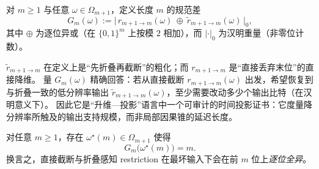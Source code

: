 \begin{definition}\label{def:fold-gauge-anomaly}
对 \(m\ge 1\) 与任意 \(\omega\in\Omega_{m+1}\)，定义长度 \(m\) 的规范差
$$
G_m(\omega)
:=\bigl|\,r_{m+1\to m}(\omega)\ \oplus\ \widetilde r_{m+1\to m}(\omega)\,\bigr|_0,
$$
其中 \(\oplus\) 为逐位异或（在 \(\{0,1\}^m\) 上按模 \(2\) 相加），而 \(|\cdot|_0\) 为汉明重量（非零位计数）。
\end{definition}

\begin{remark}
\(\widetilde r_{m+1\to m}\) 在定义上是“先折叠再截断”的粗化；而 \(r_{m+1\to m}\) 是“直接丢弃末位”的直接降维。
量 \(G_m(\omega)\) 精确回答：若从直接截断 \(r_{m+1\to m}(\omega)\) 出发，希望恢复到与折叠一致的低分辨率输出 \(\widetilde r_{m+1\to m}(\omega)\)，至少需要改动多少个输出比特（在汉明意义下）。
因此它是“升维—投影”语言中一个可审计的时间投影证书：它度量降分辨率所触及的输出支持规模，而非局部因果锥的延迟长度。
\end{remark}

\begin{theorem}\label{thm:fold-gauge-anomaly-max}
对任意 \(m\ge 1\)，存在 \(\omega^\star(m)\in\Omega_{m+1}\) 使得
$$
G_m\bigl(\omega^\star(m)\bigr)=m.
$$
换言之，直接截断与折叠感知 restriction 在最坏输入下会在前 \(m\) 位上\emph{逐位全异}。
\end{theorem}

